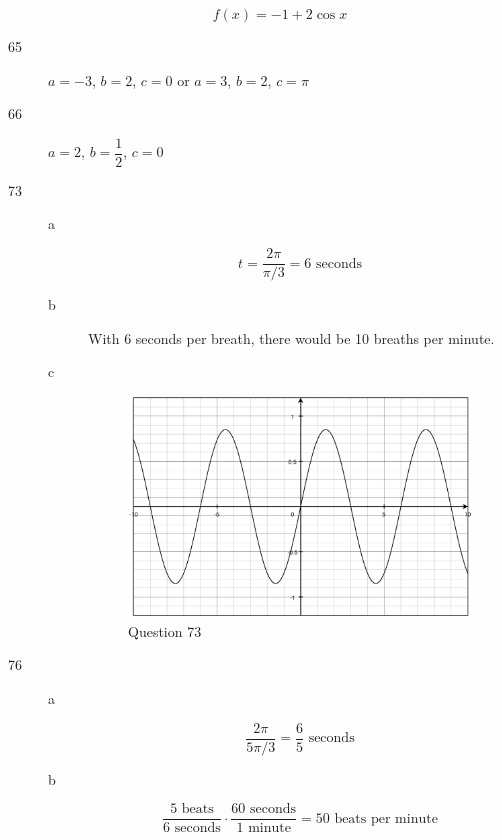 \documentclass[fleqn,addpoints]{exam}
\begin{document}
\begin{description}
\[
  f(x) = -1 + 2 \cos x
\]

\item[65] $a = -3$, $b = 2$, $c = 0$ or $a = 3$, $b = 2$, $c = \pi$

\item[66] $a=2$, $b = \dfrac{1}{2}$, $c = 0$

\item[73]
\begin{description}
\item[a] 
\[
  t = \dfrac{2 \pi}{\pi / 3} = 6 \text{ seconds}
\]

\item[b]
With 6 seconds per breath, there would be 10 breaths per minute.


\item[c]
\begin{figure}[H]
  \centering
  \includegraphics[scale=.3]{question73.eps}
  \caption*{Question 73}
\end{figure}

\end{description}

\item[76]

\begin{description}
\item[a]
\[
  \frac{2 \pi}{5 \pi/3} = \frac{6}{5} \text{ seconds}
\]

\item[b]

\[
  \frac{5 \text{ beats}}{6 \text{ seconds}} \cdot \frac{60 \text{ seconds}}{1 \text{ minute}} = 50 \text{ beats per minute}
\]

\end{description}


\end{description}
\end{document}
